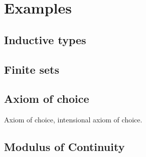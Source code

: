 \section{Examples}
\label{sec:examples}


\subsection{Inductive types}
\label{sec:inductive-types}


\subsection{Finite sets}
\label{sec:finite-sets}


\subsection{Axiom of choice}
\label{sec:axiom-choice}

Axiom of choice, intensional axiom of choice.


\subsection{Modulus of Continuity}
\label{sec:we-show-modulus-of-continuity-example}

